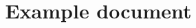 \documentclass[letterpaper,portrait]{{class_file}}
\begin{document}
\title{Example document}
\maketitle
\clearpage


\end{document}
